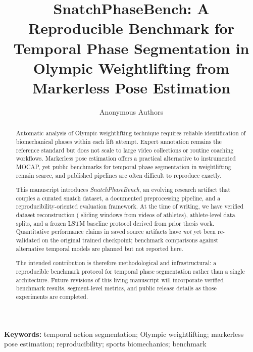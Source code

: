 \documentclass[11pt,a4paper]{article}
\title{SnatchPhaseBench: A Reproducible Benchmark for Temporal Phase Segmentation in Olympic Weightlifting from Markerless Pose Estimation}
\author{%
  Anonymous Authors
}
\date{} %
\begin{document}
\maketitle

\begin{abstract}
\noindent
Automatic analysis of Olympic weightlifting technique requires reliable identification of biomechanical phases within each lift attempt.
Expert annotation remains the reference standard but does not scale to large video collections or routine coaching workflows.
Markerless pose estimation offers a practical alternative to instrumented \acs{MOCAP}, yet public benchmarks for temporal phase segmentation in weightlifting remain scarce, and published pipelines are often difficult to reproduce exactly.

This manuscript introduces \emph{SnatchPhaseBench}, an evolving research artifact that couples a curated snatch dataset, a documented preprocessing pipeline, and a reproducibility-oriented evaluation framework.
At the time of writing, we have verified dataset reconstruction (\numwindows{} sliding windows from \numvideos{} videos of \numathletes{} athletes), athlete-level data splits, and a frozen \acs{LSTM} baseline protocol derived from prior thesis work.
Quantitative performance claims in saved source artifacts have \emph{not} yet been re-validated on the original trained checkpoint; benchmark comparisons against alternative temporal models are planned but not reported here.

The intended contribution is therefore methodological and infrastructural: a reproducible benchmark protocol for temporal phase segmentation rather than a single architecture.
Future revisions of this living manuscript will incorporate verified benchmark results, segment-level metrics, and public release details as those experiments are completed.
\end{abstract}

\noindent\textbf{Keywords:} temporal action segmentation; Olympic weightlifting; markerless pose estimation; reproducibility; sports biomechanics; benchmark













\end{document}
